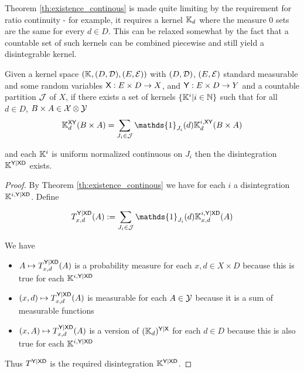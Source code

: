 Theorem \ref{th:existence_continous} is made quite limiting by the requirement for ratio continuity - for example, it requires a kernel $\mathbb{K}_d$ where the measure 0 sets are the same for every $d\in D$. This can be relaxed somewhat by the fact that a countable set of such kernels can be combined piecewise and still yield a disintegrable kernel.

\begin{theorem}
Given a kernel space $(\mathbb{K},(D,\mathcal{D}),(E,\mathcal{E}))$ with $(D,\mathcal{D})$, $(E,\mathcal{E})$ standard measurable and some random variables $\mathsf{X}:E\times D\to X$, and $\mathsf{Y}:E\times D\to Y$ and a countable partition $\mathcal{J}$ of $X$, if there exists a set of kernels $\{\mathbb{K}^i|i\in \mathbb{N}\}$ such that for all $d\in D$, $B\times A\in \mathcal{X}\otimes\mathcal{Y}$
\begin{align}
	\kernel{K}_d^{\RV{XY}}(B\times A) = \sum_{J_i\in \sigalg{J}} \mathds{1}_{J_i}(d)\kernel{K}_{d}^{i,\RV{XY}}(B\times A)
\end{align}

and each $\mathbb{K}^i$ is uniform normalized continuous on $J_i$ then the disintegration $\mathbb{K}^{\mathsf{Y}|\mathsf{XD}}$ exists.
\end{theorem}

\begin{proof}

By Theorem \ref{th:existence_continous} we have for each $i$ a disintegration $\mathbb{K}^{i,\mathsf{Y}|\mathsf{XD}}$. Define

\begin{align}
	T^{\RV{Y}|\RV{XD}}_{x,d}(A) := \sum_{J_i\in \sigalg{J}} \mathds{1}_{J_i}(d)\kernel{K}_{x,d}^{i,\RV{Y}|\RV{XD}}(A)
\end{align}

We have

\begin{itemize}	
	\item $A\mapsto T^{\mathsf{Y}|\mathsf{XD}}_{x,d}(A)$ is a probability measure for each $x,d\in X\times D$ because this is true for each $\mathbb{K}^{i,\mathsf{Y}|\mathsf{XD}}$
	\item $(x,d)\mapsto T^{\mathsf{Y}|\mathsf{XD}}_{x,d}(A)$ is measurable for each $A\in \mathcal{Y}$ because it is a sum of measurable functions
	\item $(x,A)\mapsto T^{\mathsf{Y}|\mathsf{XD}}_{x,d}(A)$ is a version of $(\mathbb{K}_d)^{\mathsf{Y}|\mathsf{X}}$ for each $d\in D$ because this is also true for each $\mathbb{K}^{i,\mathsf{Y}|\mathsf{XD}}$
\end{itemize}

Thus $T^{\mathsf{Y}|\mathsf{XD}}$ is the required disintegration $\mathbb{K}^{\mathsf{Y}|\mathsf{XD}}$.
\end{proof}


